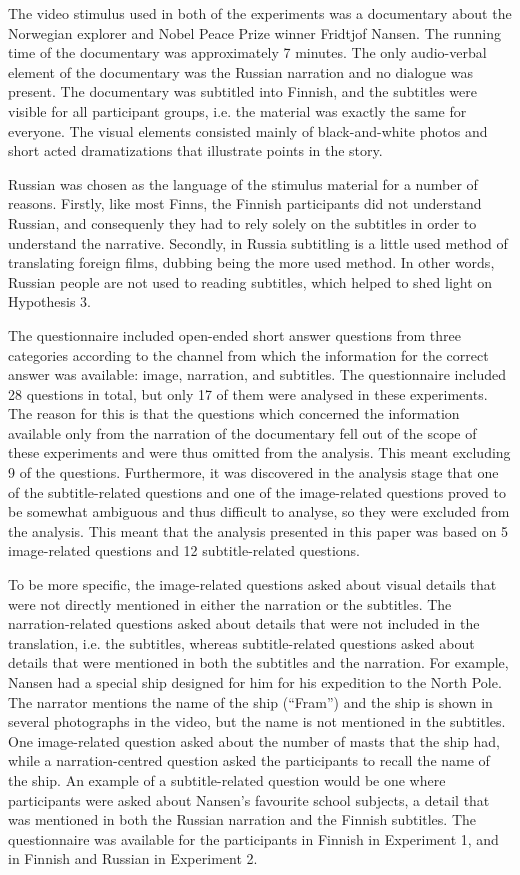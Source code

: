 \documentclass[output=paper]{langsci/langscibook}
\begin{document}
The video stimulus used in both of the experiments was a documentary about the Norwegian explorer and Nobel Peace Prize winner Fridtjof Nansen. The running time of the documentary was approximately 7 minutes. The only audio-verbal element of the documentary was the Russian narration and no dialogue was present. The documentary was subtitled into Finnish, and the subtitles were visible for all participant groups, i.e. the material was exactly the same for everyone. The visual elements consisted mainly of black-and-white photos and short acted dramatizations that illustrate points in the story. 

Russian was chosen as the language of the stimulus material for a number of reasons. Firstly, like most Finns, the Finnish participants did not understand Russian, and consequenly they had to rely solely on the subtitles in order to understand the narrative. Secondly, in Russia subtitling is a little used method of translating foreign films, dubbing being the more used method. In other words, Russian people are not used to reading subtitles, which helped to shed light on Hypothesis 3. 

The questionnaire included open-ended short answer questions from three categories according to the channel from which the information for the correct answer was available: image, narration, and subtitles. The questionnaire included 28 questions in total, but only 17 of them were analysed in these experiments. The reason for this is that the questions which concerned the information available only from the narration of the documentary fell out of the scope of these experiments and were thus omitted from the analysis. This meant excluding 9 of the questions. Furthermore, it was discovered in the analysis stage that one of the subtitle-related questions and one of the image-related questions proved to be somewhat ambiguous and thus difficult to analyse, so they were excluded from the analysis. This meant that the analysis presented in this paper was based on 5 image-related questions and 12 subtitle-related questions. 

To be more specific, the image-related questions asked about visual details that were not directly mentioned in either the narration or the subtitles. The narration-related questions asked about details that were not included in the translation, i.e. the subtitles, whereas subtitle-related questions asked about details that were mentioned in both the subtitles and the narration. For example, Nansen had a special ship designed for him for his expedition to the North Pole. The narrator mentions the name of the ship (“Fram”) and the ship is shown in several photographs in the video, but the name is not mentioned in the subtitles. One image-related question asked about the number of masts that the ship had, while a narration-centred question asked the participants to recall the name of the ship. An example of a subtitle-related question would be one where participants were asked about Nansen’s favourite school subjects, a detail that was mentioned in both the Russian narration and the Finnish subtitles. The questionnaire was available for the participants in Finnish in Experiment 1, and in Finnish and Russian in Experiment 2.
\end{document}
